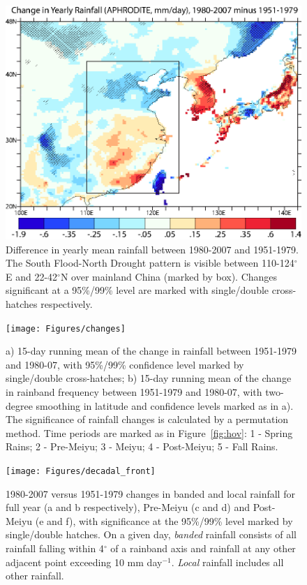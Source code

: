 \documentclass{ametsoc}
\begin{document}
\begin{figure}
\centering
\noindent\includegraphics[width=36pc]{Figures/changes_2d_nojet}
\caption{Difference in yearly mean rainfall between 1980-2007 and 1951-1979. The South Flood-North Drought pattern is visible between 110-124$^{\circ}$E and 22-42$^{\circ}$N over mainland China (marked by box). Changes significant at a 95\%/99\% level are marked with single/double cross-hatches respectively.}
\label{fig:f31}
\end{figure}

\begin{figure}[htbp]
\centering
\noindent\texttt{[image: Figures/changes]}
\caption{a) 15-day running mean of the change in rainfall between 1951-1979 and 1980-07, with 95\%/99\% confidence level marked by single/double cross-hatches; b) 15-day running mean of the change in rainband frequency between 1951-1979 and 1980-07, with two-degree smoothing in latitude and confidence levels marked as in a). The significance of rainfall changes is calculated by a permutation method. Time periods are marked as in Figure~\ref{fig:hov}: 1 - Spring Rains; 2 - Pre-Meiyu; 3 - Meiyu; 4 - Post-Meiyu; 5 - Fall Rains.}
\label{fig:changes}
\end{figure}

\begin{figure}[htb]
\centering
\noindent\texttt{[image: Figures/decadal\_front]}
\caption{1980-2007 versus 1951-1979 changes in banded and local rainfall for full year (a and b respectively), Pre-Meiyu (c and d) and Post-Meiyu (e and f), with significance at the 95\%/99\% level marked by single/double hatches.  On a given day, \textit{banded} rainfall consists of all rainfall falling within 4$^{\circ}$ of a rainband axis and rainfall at any other adjacent point exceeding 10 mm day$^{-1}$. \textit{Local} rainfall includes all other rainfall.}
\label{fig:decadal_front}
\end{figure}
\end{document}
